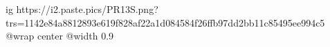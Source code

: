  
 
 
 
 

\ifcmt
  ig https://i2.paste.pics/PR13S.png?trs=1142e84a8812893e619f828af22a1d084584f26ffb97dd2bb11c85495ee994c5
  @wrap center
  @width 0.9
\fi
